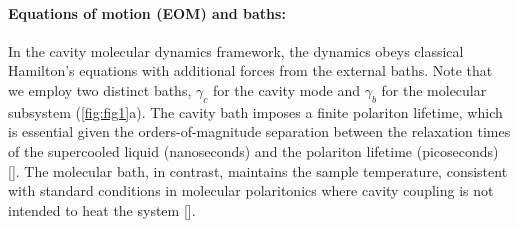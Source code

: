 \documentclass[aps, prl,
 reprint,
 superscriptaddress,
 citeautoscript,  %
 amsmath,amssymb,
 tightenlines
]{revtex4-2}
\begin{document}

\paragraph*{Equations of motion (EOM) and baths:} 
In the cavity molecular dynamics framework, the dynamics obeys classical Hamilton's equations with additional forces from the external baths. %
Note that we employ two distinct baths, $\gamma_c$ for the cavity mode and $\gamma_b$ for the molecular subsystem (\cref{fig:fig1}a). The cavity bath imposes a finite polariton lifetime, which is essential given the orders-of-magnitude separation between the relaxation times of the supercooled liquid (nanoseconds) and the polariton lifetime (picoseconds) []. The molecular bath, in contrast, maintains the sample temperature, consistent with standard conditions in molecular polaritonics where cavity coupling is not intended to heat the system [].
\end{document}
